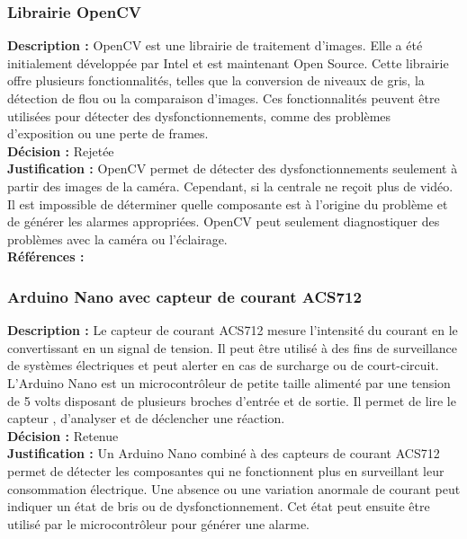 \subsubsection{Librairie OpenCV}

\noindent
\textbf{Description :} OpenCV est une librairie de traitement d’images. Elle a été
initialement développée par Intel et est maintenant Open Source. Cette
librairie offre plusieurs fonctionnalités, telles que la conversion de niveaux
de gris, la détection de flou ou la comparaison d'images. Ces fonctionnalités
peuvent être utilisées pour détecter des dysfonctionnements, comme des
problèmes d’exposition ou une perte de frames. \\

\noindent
\textbf{Décision :} Rejetée \\

\noindent
\textbf{Justification :} OpenCV permet de détecter des dysfonctionnements seulement à partir des
images de la caméra. Cependant, si la centrale ne reçoit plus de vidéo. Il est
impossible de déterminer quelle composante est à l’origine du problème et de
générer les alarmes appropriées. OpenCV peut seulement diagnostiquer des
problèmes avec la caméra ou l’éclairage. \\

\noindent
\textbf{Références :} \\

\subsubsection{Arduino Nano avec capteur de courant ACS712}

\noindent
\textbf{Description :} Le capteur de courant ACS712 mesure l'intensité du courant en le
convertissant en un signal de tension. Il peut être utilisé à des fins de
surveillance de systèmes électriques et peut alerter en cas de surcharge ou de
court-circuit. L'Arduino Nano est un microcontrôleur de petite taille alimenté
par une tension de 5 volts disposant de plusieurs broches d'entrée et de
sortie. Il permet de lire le capteur , d'analyser et de déclencher une
réaction. \\

\noindent
\textbf{Décision :} Retenue \\

\noindent
\textbf{Justification :} Un Arduino Nano combiné à des
capteurs de courant ACS712 permet de détecter les composantes qui ne
fonctionnent plus en surveillant leur consommation électrique. Une absence ou
une variation anormale de courant peut indiquer un état de bris ou de
dysfonctionnement. Cet état peut ensuite être utilisé par le microcontrôleur
pour générer une alarme. \\

